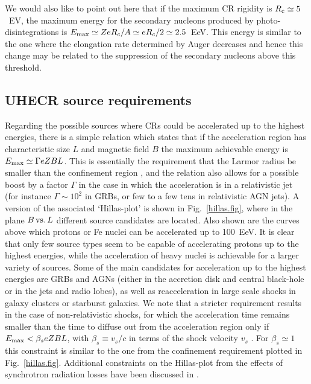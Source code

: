 \documentclass[twoside,12pt]{article}
\begin{document}
We would also like to point out here that if the maximum CR rigidity is $R_{\rm c}\simeq 5$~EV, the maximum energy for the secondary nucleons produced by photo-disintegrations is $E_{\rm max} \simeq Z e R_c/A\simeq e R_c/2\simeq 2.5$~EeV. This energy is similar to the one where the elongation rate determined by Auger decreases  \cite{augerxmax} and hence this change may be related to the suppression of the secondary nucleons above this threshold.

\subsection{UHECR source requirements}
Regarding the possible sources where CRs could be accelerated up to the highest energies, there is a simple relation which states that if the acceleration region has characteristic size $L$ and magnetic field $B$ the maximum achievable energy is $E_{\rm max}\simeq \Gamma eZBL$. This is essentially the requirement that the Larmor radius be smaller than the confinement region \cite{hillas}, and the relation also allows for a possible boost by a factor $\Gamma$ in the case in which the acceleration is in a relativistic jet (for instance $\Gamma\sim 10^2$ in GRBs, or few to a few tens in relativistic AGN jets). A version of the associated `Hillas-plot' is shown in Fig.~\ref{hillas.fig}, where in the plane $B\,{\rm vs.}\,L$ different source candidates are located. Also shown are the curves above which protons or Fe nuclei can be accelerated up to 100~EeV.  It is clear that only few source types seem to be capable of accelerating protons up to the highest energies, while the acceleration of heavy nuclei is achievable for a larger variety of sources.  Some of the main candidates for acceleration up to the highest energies are GRBs and AGNs (either in the accretion disk and central black-hole or in  the jets and radio lobes), as well as reacceleration in large scale shocks in galaxy clusters or starburst galaxies. We note that a  stricter requirement results in the case of non-relativistic shocks, for which the acceleration time remains smaller than the time to diffuse out from the acceleration region  only if $E_{\rm max}< \beta_s eZBL$, with $\beta_s\equiv v_s/c$ in terms of the shock velocity $v_s$ \cite{hillas}. For $\beta_s\simeq 1$ this constraint is similar to the one from the confinement requirement plotted in Fig.~\ref{hillas.fig}.
Additional constraints on the Hillas-plot from the effects of synchrotron radiation losses have been discussed in \cite{hillas,ah02,pt10b}.
\end{document}
